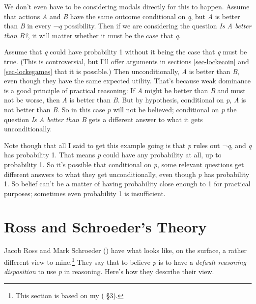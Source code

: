 \documentclass[
  10pt,
  letterpaper,
  twoside]{scrbook}
\begin{document}
We don't even have to be considering modals directly for this to happen.
Assume that actions \emph{A} and \emph{B} have the same outcome
conditional on \emph{q}, but \emph{A} is better than \emph{B} in every
¬\emph{q} possibility. Then if we are considering the question \emph{Is
A better than B?}, it will matter whether it must be the case that
\emph{q}.

Assume that \emph{q} could have probability 1 without it being the case
that \emph{q} must be true. (This is controversial, but I'll offer
arguments in sections \ref{sec-lockecoin} and \ref{sec-lockegames} that
it is possible.) Then unconditionally, \emph{A} is better than \emph{B},
even though they have the same expected utility. That's because weak
dominance is a good principle of practical reasoning: If \emph{A} might
be better than \emph{B} and must not be worse, then \emph{A} is better
than \emph{B}. But by hypothesis, conditional on \emph{p}, \emph{A} is
not better than \emph{B}. So in this case \emph{p} will not be believed;
conditional on \emph{p} the question \emph{Is A better than B} gets a
different answer to what it gets unconditionally.

Note though that all I said to get this example going is that \emph{p}
rules out ¬\emph{q}, and \emph{q} has probability 1. That means \emph{p}
could have any probability at all, up to probability 1. So it's possible
that conditional on \emph{p}, some relevant questions get different
answers to what they get unconditionally, even though \emph{p} has
probability 1. So belief can't be a matter of having probability close
enough to 1 for practical purposes; sometimes even probability 1 is
insufficient.

\section{Ross and Schroeder's Theory}\label{sec-usc}

Jacob Ross and Mark Schroeder ()
have what looks like, on the surface, a rather different view to
mine.\footnote{This section is based on my
  ( §3).} They say that to believe
\emph{p} is to have a \emph{default reasoning disposition} to use
\emph{p} in reasoning. Here's how they describe their view.
\end{document}
